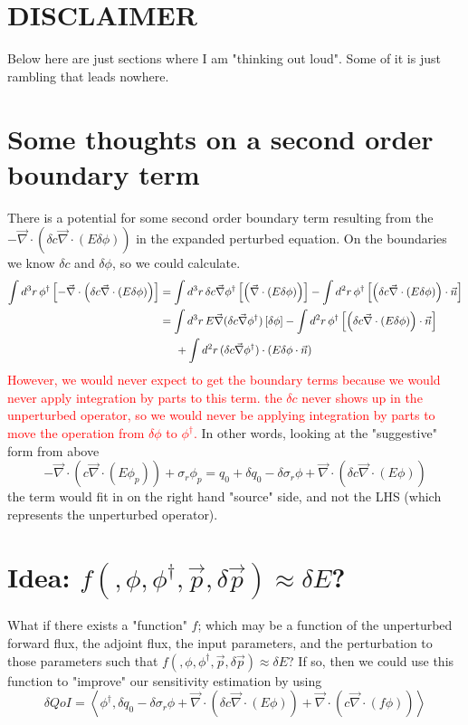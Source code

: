 \documentclass{article}
\newcommand{\bra}{\left\langle}
\newcommand{\ket}{\right\rangle}
\newcommand{\vdiv}{\vec{\nabla} \cdot}
\newcommand{\vgrad}{\vec{\nabla}}
\newcommand{\intrrr}{\int d^3 r \,}
\newcommand{\intrr}{\int d^2 r \,}
\begin{document}
\section*{DISCLAIMER}
Below here are just sections where I am "thinking out loud". Some of it is just rambling that leads nowhere.

\section{Some thoughts on a second order boundary term}
There is a potential for some second order boundary term resulting from the $- \vdiv \left( \delta c \vdiv \left( E \delta \phi \right) \right)$ in the expanded perturbed equation. On the boundaries we know $\delta c$ and $\delta \phi$, so we could calculate.
\begin{align*}
\intrrr \phi^\dag \left[ - \vdiv \left( \delta c \vdiv \left( E \delta \phi \right) \right) \right] 
&= \intrrr \delta c  \vgrad \phi^\dag \left[  \left( \vdiv \left( E \delta \phi \right) \right) \right]  - \intrr \phi^\dag \left[  \left( \delta c \vdiv \left( E \delta \phi \right) \right) \cdot \vec{n} \right] \\
&= \intrrr E \vgrad (\delta c  \vgrad \phi^\dag) \left[ \delta \phi  \right]  - \intrr \phi^\dag \left[  \left( \delta c \vdiv \left( E \delta \phi \right) \right) \cdot \vec{n} \right] \\
&\hspace{5mm}+\intrr (\delta c  \vgrad \phi^\dag) \cdot (E \delta \phi \cdot \vec{n}) 
\end{align*}
\textcolor{red}{However, we would never expect to get the boundary terms because we would never apply integration by parts to this term. the $\delta c$ never shows up in the unperturbed operator, so we would never be applying integration by parts to move the operation from $\delta \phi$ to $\phi^\dag$.} In other words, looking at the "suggestive" form from above
\[ 
-\vdiv \left( c \vdiv \left( E \phi_p \right) \right) + \sigma_r \phi_p
= q_0 + \delta q_0 - \delta \sigma_r \phi + \vdiv \left( \delta c \vdiv \left( E \phi \right) \right) 
\]
the term would fit in on the right hand "source" side, and not the LHS (which represents the unperturbed operator).




\section{Idea: $f(,\phi,\phi^\dag,\vec{p},\delta\vec{p}) \approx \delta E$?}
What if there exists a "function" $f$; which may be a function of the unperturbed forward flux, the adjoint flux, the input parameters, and the perturbation to those parameters such that $f(,\phi,\phi^\dag,\vec{p},\delta\vec{p}) \approx \delta E$? If so, then we could use this function to "improve" our sensitivity estimation by using
\[
\delta QoI = \bra \phi^\dag , \delta q_0 - \delta \sigma_r \phi + \vdiv \left( \delta c \vdiv \left( E \phi \right) \right) + \vdiv \left( c \vdiv \left( f \phi \right) \right)  \ket
\]
\end{document}
